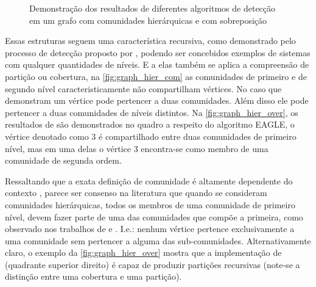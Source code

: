 \documentclass[notes.tex]{subfiles}
\begin{document}
\begin{figure}[htpb]
    \centering
    \caption{Demonstração dos resultados de diferentes algoritmos de detecção em um grafo com comunidades hierárquicas e com sobreposição}\label{fig:graph_hier_over}
\end{figure}

Essas estruturas seguem uma característica recursiva, como demonstrado pelo processo de detecção proposto por , podendo ser concebidos exemplos de sistemas com qualquer quantidades de níveis.
E a elas também se aplica a compreensão de partição ou cobertura, na \autoref{fig:graph_hier_com} as comunidades de primeiro e de segundo nível caracteristicamente não compartilham vértices.
No caso que demonstram  um vértice pode pertencer a duas comunidades.
Além disso ele pode pertencer a duas comunidades de níveis distintos.
Na \autoref{fig:graph_hier_over}, os resultados de  são demonstrados no quadro a respeito do algoritmo EAGLE, o vértice denotado como 3 é compartilhado entre duas comunidades de primeiro nível, mas em uma delas o vértice 3 encontra-se como membro de uma comunidade de segunda ordem.

Ressaltando que a exata definição de comunidade é altamente dependente do contexto \cite{fortunato2010community}, parece ser consenso na literatura que quando se consideram comunidades hierárquicas, todos os membros de uma comunidade de primeiro nível, devem fazer parte de uma das comunidades que compõe a primeira, como observado nos trabalhos de  e .
I.e.: nenhum vértice pertence exclusivamente a uma comunidade sem pertencer a alguma das sub-comunidades.
Alternativamente claro, o exemplo da \autoref{fig:graph_hier_over} mostra que a implementação de  (quadrante superior direito) é capaz de produzir partições recursivas (note-se a distinção entre uma cobertura e uma partição).
\end{document}
